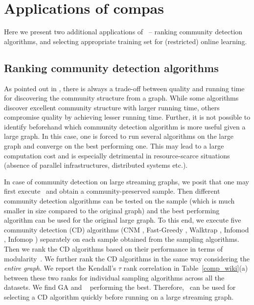 \section{Applications of compas}
Here we present two additional applications of \compas~-- ranking community detection algorithms, and selecting appropriate training set for (restricted) online learning. 
\subsection{Ranking community detection algorithms} As pointed out in \cite{maiya2010sampling}, there is always a trade-off between quality and running time for discovering the community structure from a graph. While some algorithms discover excellent community structure with larger running time, others compromise  quality by achieving lesser running time. Further, it is not possible to identify beforehand which community detection algorithm is more useful given a large graph. In this case, one is forced to run several algorithms on the large graph and converge on the best performing one. This may lead to a large computation cost and is especially detrimental in resource-scarce situations (absence of parallel infrastructures, distributed systems etc.).

In case of community detection on large streaming graphs, we 
posit that one may first execute \compas~and obtain a community-preserved sample. Then different community detection algorithms can be tested on the sample (which is much smaller in size compared to the original graph) and the best performing algorithm can be used for the original large graph. To this end, we execute five community detection (CD) algorithms (CNM \cite{clauset2004finding}, Fast-Greedy \cite{newman2004fast}, Walktrap \cite{pons2005computing}, Infomod \cite{rosvall2007information}, Infomop \cite{rosvall2008maps}) separately on each sample obtained from the sampling algorithms. Then we rank the CD algorithms based on their performance in terms of  modularity~\cite{newman2004analysis}. We further rank the CD algorithms in the same way considering the {\em entire graph}. We report the Kendall's $\tau$ rank correlation in Table~\ref{comp_wiki}(a) between these two ranks for individual sampling algorithms across all the datasets. We find GA and \compas~ performing the best. Therefore, \compas~can be used for selecting a CD algorithm quickly before running on a large streaming graph.




